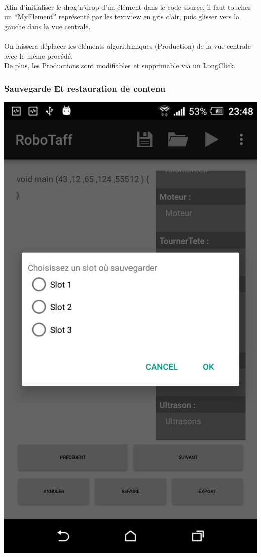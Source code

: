 \documentclass[a4paper]{article}
\begin{document}
\paragraph{}
Afin d’initialiser le drag'n'drop d’un élément dans le code source, il faut toucher un “MyElement” représenté par les textview en gris clair, puis glisser vers la gauche dans la vue centrale.

\paragraph{}
On laissera déplacer les éléments algorithmiques (Production) de la vue centrale avec le même procédé.\\
De plus, les Productions sont modifiables et supprimable via un LongClick. 

\subsubsection{Sauvegarde Et restauration de contenu}
\begin{center}
\includegraphics[scale=0.2]{img/save.png}
\end{center}
\end{document}
